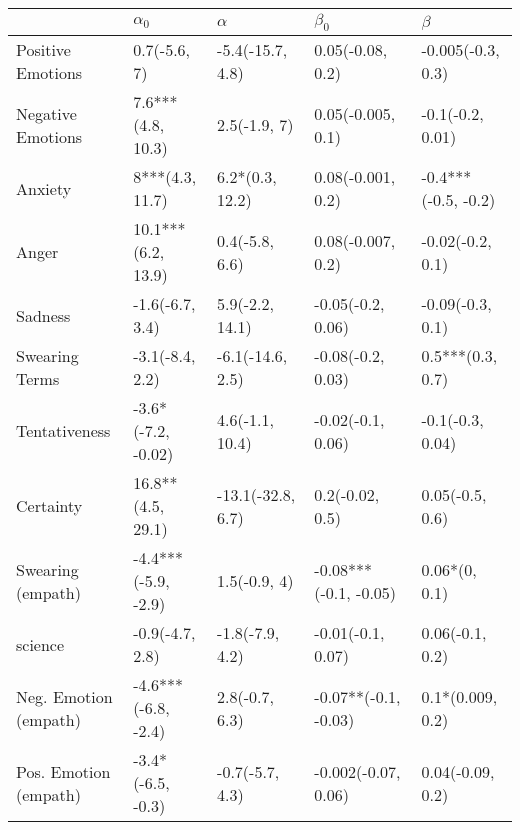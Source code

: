 \begin{tabular}{lllll}
\toprule
{} &           $\alpha_0$ &           $\alpha$ &              $\beta_0$ &              $\beta$ \\
\midrule
Positive Emotions     &         0.7(-5.6, 7) &   -5.4(-15.7, 4.8) &       0.05(-0.08, 0.2) &    -0.005(-0.3, 0.3) \\
Negative Emotions     &    7.6***(4.8, 10.3) &       2.5(-1.9, 7) &      0.05(-0.005, 0.1) &     -0.1(-0.2, 0.01) \\
Anxiety               &      8***(4.3, 11.7) &    6.2*(0.3, 12.2) &      0.08(-0.001, 0.2) &  -0.4***(-0.5, -0.2) \\
Anger                 &   10.1***(6.2, 13.9) &     0.4(-5.8, 6.6) &      0.08(-0.007, 0.2) &     -0.02(-0.2, 0.1) \\
Sadness               &      -1.6(-6.7, 3.4) &    5.9(-2.2, 14.1) &      -0.05(-0.2, 0.06) &     -0.09(-0.3, 0.1) \\
Swearing Terms        &      -3.1(-8.4, 2.2) &   -6.1(-14.6, 2.5) &      -0.08(-0.2, 0.03) &     0.5***(0.3, 0.7) \\
Tentativeness         &   -3.6*(-7.2, -0.02) &    4.6(-1.1, 10.4) &      -0.02(-0.1, 0.06) &     -0.1(-0.3, 0.04) \\
Certainty             &    16.8**(4.5, 29.1) &  -13.1(-32.8, 6.7) &        0.2(-0.02, 0.5) &      0.05(-0.5, 0.6) \\
Swearing (empath)     &  -4.4***(-5.9, -2.9) &       1.5(-0.9, 4) &  -0.08***(-0.1, -0.05) &        0.06*(0, 0.1) \\
science               &      -0.9(-4.7, 2.8) &    -1.8(-7.9, 4.2) &      -0.01(-0.1, 0.07) &      0.06(-0.1, 0.2) \\
Neg. Emotion (empath) &  -4.6***(-6.8, -2.4) &     2.8(-0.7, 6.3) &   -0.07**(-0.1, -0.03) &     0.1*(0.009, 0.2) \\
Pos. Emotion (empath) &    -3.4*(-6.5, -0.3) &    -0.7(-5.7, 4.3) &    -0.002(-0.07, 0.06) &     0.04(-0.09, 0.2) \\
\bottomrule
\end{tabular}

